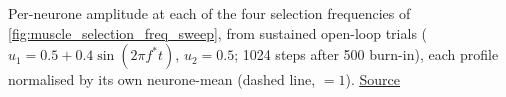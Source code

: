 Per-neurone amplitude at each of the four selection frequencies of \autoref{fig:muscle_selection_freq_sweep}, from sustained open-loop trials ($u_1 = 0.5 + 0.4\sin(2\pi f^* t)$, $u_2 = 0.5$; 1024 steps after 500 burn-in), each profile normalised by its own neurone-mean (dashed line, $= 1$). \href{https://github.com/tahmidazam/gg4/blob/main/notebooks/neural_correlates/neural_correlates.ipynb}{\underline{Source}}%